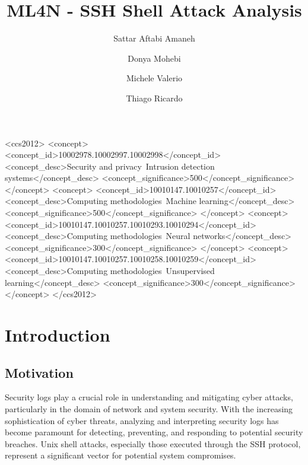 \documentclass[acmlarge,screen,nonacm]{acmart}
\title{ML4N - SSH Shell Attack Analysis}
\author{Sattar Aftabi Amaneh}
\affiliation{%
  \institution{Politecnico di Torino}
  \city{Turin}
  \country{Italy}
}
\author{Donya Mohebi}
\affiliation{%
  \institution{Politecnico di Torino}
  \city{Turin}
  \country{Italy}
}
\author{Michele Valerio}
\affiliation{%
  \institution{Politecnico di Torino}
  \city{Turin}
  \country{Italy}
}
\author{Thiago Ricardo}
\affiliation{%
  \institution{Politecnico di Torino}
  \city{Turin}
  \country{Italy}
}
\begin{document}
\begin{CCSXML}
<ccs2012>
   <concept>
       <concept_id>10002978.10002997.10002998</concept_id>
       <concept_desc>Security and privacy~Intrusion detection systems</concept_desc>
       <concept_significance>500</concept_significance>
       </concept>
   <concept>
       <concept_id>10010147.10010257</concept_id>
       <concept_desc>Computing methodologies~Machine learning</concept_desc>
       <concept_significance>500</concept_significance>
       </concept>
   <concept>
       <concept_id>10010147.10010257.10010293.10010294</concept_id>
       <concept_desc>Computing methodologies~Neural networks</concept_desc>
       <concept_significance>300</concept_significance>
       </concept>
    <concept>
       <concept_id>10010147.10010257.10010258.10010259</concept_id>
       <concept_desc>Computing methodologies~Unsupervised learning</concept_desc>
       <concept_significance>300</concept_significance>
       </concept>
 </ccs2012>
\end{CCSXML}


\maketitle

\section{Introduction}

\subsection{Motivation}

Security logs play a crucial role in understanding and mitigating cyber attacks, particularly in the domain of network and system security. With the increasing sophistication of cyber threats, analyzing and interpreting security logs has become paramount for detecting, preventing, and responding to potential security breaches. Unix shell attacks, especially those executed through the SSH protocol, represent a significant vector for potential system compromises.
\end{document}
